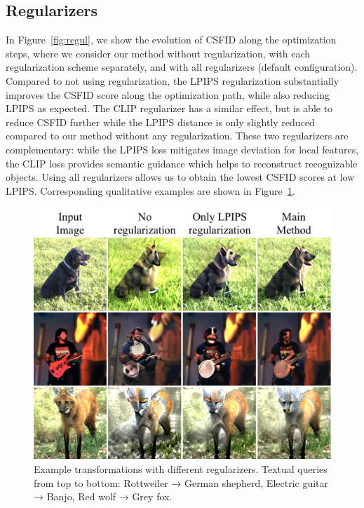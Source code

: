 \subsection{Regularizers}
In Figure~\ref{fig:regul}, we show the evolution of \ac{CSFID} along the optimization steps, 
where we consider our method without regularization, with each regularization scheme 
separately, and with all regularizers (default configuration).
Compared to not using regularization, the \ac{LPIPS} regularization substantially improves
 the \ac{CSFID} score along the optimization path, while also reducing \ac{LPIPS} as expected. 
The \ac{CLIP} regularizer has a similar effect, but is able to reduce  \ac{CSFID} further while
 the \ac{LPIPS} distance is only slightly reduced compared to our method without any 
 regularization.
These two regularizers are complementary: while the \ac{LPIPS} loss mitigates image 
deviation for local features, the \ac{CLIP} loss provides semantic guidance which helps to 
reconstruct recognizable objects. %
Using all regularizers allows us to obtain the lowest \ac{CSFID} scores at low \ac{LPIPS}. 
Corresponding qualitative examples are shown in Figure~\ref{fig:demo_reg}. 

\begin{figure}
    \centering
    \vspace{-1em}
    \includegraphics[width=\linewidth]{images/flexit/assets/demo_reg2.pdf}
    \caption{Example transformations with different regularizers. Textual queries from top to bottom: Rottweiler → German shepherd, Electric guitar → Banjo, Red wolf → Grey fox.
    }
    \label{fig:demo_reg}
\end{figure}


